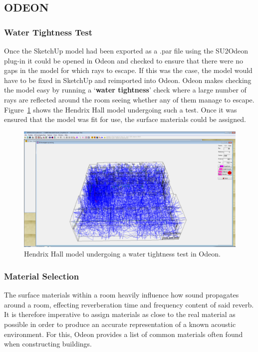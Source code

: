 \documentclass[../../main.tex]{subfiles}
\begin{document}
\subsection{ODEON}
	\label{odeon}
	\subsubsection{Water Tightness Test}
		Once the SketchUp model had been exported as a .par file using the SU2Odeon plug-in \cite{SU2Odeon} it could be opened in Odeon and checked to ensure that there were no gaps in the model for which rays to escape. If this was the case, the model would have to be fixed in SketchUp and reimported into Odeon. Odeon makes checking the model easy by running a `\textbf{water tightness}' check where a large number of rays are reflected around the room seeing whether any of them manage to escape. Figure~\ref{watertight} shows the Hendrix Hall model undergoing such a test. Once it was ensured that the model was fit for use, the surface materials could be assigned.

		\begin{figure}[H]
			\centerline{\includegraphics[scale = 0.3]{Sections/Implementation/Odeon/images/OdeonRays/waterTight2.PNG}}
			\caption{Hendrix Hall model undergoing a water tightness test in Odeon.}
			\label{watertight}
		\end{figure}

	\subsubsection{Material Selection}
	\label{odeon:materials}
		The surface materials within a room heavily influence how sound propagates around a room, effecting reverberation time and frequency content of said reverb. It is therefore imperative to assign materials as close to the real material as possible in order to produce an accurate representation of a known acoustic environment. For this, Odeon provides a list of common materials often found when constructing buildings.
\end{document}
